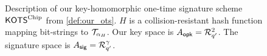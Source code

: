 \begin{figure}
\centering
\begin{pcvstack}
\begin{pchstack}[center]
  \pchspace
  \pchspace
  \end{pchstack}
  \pchspace
  \begin{pchstack}
  \begin{pcvstack}
  \pcvspace
  \pcvspace
  \end{pcvstack}
  \pchspace
\end{pchstack}
\end{pcvstack}
\caption{%
Description of our key-homomorphic one-time signature scheme $\mathsf{KOTS}^{\textup{Chip}}$ from \autoref{def:our_ots}.
$H$ is a collision-resistant hash function mapping bit-strings to $\mathcal{T}_{\alpha_H}$.
Our key space is $A_{\mathsf{opk}} = \mathcal{R}_{q'}^{2}$.
The signature space is $A_{\mathsf{sig}} = \mathcal{R}_{q'}^\gamma$.
}
\label{fig:otsconstruction}
\end{figure}

